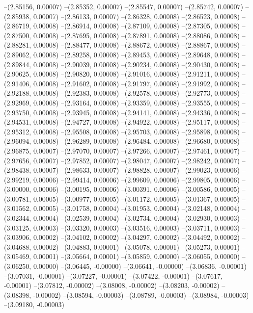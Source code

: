 --(2.85156, 0.00007)
--(2.85352, 0.00007)
--(2.85547, 0.00007)
--(2.85742, 0.00007)
--(2.85938, 0.00007)
--(2.86133, 0.00007)
--(2.86328, 0.00008)
--(2.86523, 0.00008)
--(2.86719, 0.00008)
--(2.86914, 0.00008)
--(2.87109, 0.00008)
--(2.87305, 0.00008)
--(2.87500, 0.00008)
--(2.87695, 0.00008)
--(2.87891, 0.00008)
--(2.88086, 0.00008)
--(2.88281, 0.00008)
--(2.88477, 0.00008)
--(2.88672, 0.00008)
--(2.88867, 0.00008)
--(2.89062, 0.00008)
--(2.89258, 0.00008)
--(2.89453, 0.00008)
--(2.89648, 0.00008)
--(2.89844, 0.00008)
--(2.90039, 0.00008)
--(2.90234, 0.00008)
--(2.90430, 0.00008)
--(2.90625, 0.00008)
--(2.90820, 0.00008)
--(2.91016, 0.00008)
--(2.91211, 0.00008)
--(2.91406, 0.00008)
--(2.91602, 0.00008)
--(2.91797, 0.00008)
--(2.91992, 0.00008)
--(2.92188, 0.00008)
--(2.92383, 0.00008)
--(2.92578, 0.00008)
--(2.92773, 0.00008)
--(2.92969, 0.00008)
--(2.93164, 0.00008)
--(2.93359, 0.00008)
--(2.93555, 0.00008)
--(2.93750, 0.00008)
--(2.93945, 0.00008)
--(2.94141, 0.00008)
--(2.94336, 0.00008)
--(2.94531, 0.00008)
--(2.94727, 0.00008)
--(2.94922, 0.00008)
--(2.95117, 0.00008)
--(2.95312, 0.00008)
--(2.95508, 0.00008)
--(2.95703, 0.00008)
--(2.95898, 0.00008)
--(2.96094, 0.00008)
--(2.96289, 0.00008)
--(2.96484, 0.00008)
--(2.96680, 0.00008)
--(2.96875, 0.00007)
--(2.97070, 0.00007)
--(2.97266, 0.00007)
--(2.97461, 0.00007)
--(2.97656, 0.00007)
--(2.97852, 0.00007)
--(2.98047, 0.00007)
--(2.98242, 0.00007)
--(2.98438, 0.00007)
--(2.98633, 0.00007)
--(2.98828, 0.00007)
--(2.99023, 0.00006)
--(2.99219, 0.00006)
--(2.99414, 0.00006)
--(2.99609, 0.00006)
--(2.99805, 0.00006)
--(3.00000, 0.00006)
--(3.00195, 0.00006)
--(3.00391, 0.00006)
--(3.00586, 0.00005)
--(3.00781, 0.00005)
--(3.00977, 0.00005)
--(3.01172, 0.00005)
--(3.01367, 0.00005)
--(3.01562, 0.00005)
--(3.01758, 0.00004)
--(3.01953, 0.00004)
--(3.02148, 0.00004)
--(3.02344, 0.00004)
--(3.02539, 0.00004)
--(3.02734, 0.00004)
--(3.02930, 0.00003)
--(3.03125, 0.00003)
--(3.03320, 0.00003)
--(3.03516, 0.00003)
--(3.03711, 0.00003)
--(3.03906, 0.00002)
--(3.04102, 0.00002)
--(3.04297, 0.00002)
--(3.04492, 0.00002)
--(3.04688, 0.00002)
--(3.04883, 0.00001)
--(3.05078, 0.00001)
--(3.05273, 0.00001)
--(3.05469, 0.00001)
--(3.05664, 0.00001)
--(3.05859, 0.00000)
--(3.06055, 0.00000)
--(3.06250, 0.00000)
--(3.06445, -0.00000)
--(3.06641, -0.00000)
--(3.06836, -0.00001)
--(3.07031, -0.00001)
--(3.07227, -0.00001)
--(3.07422, -0.00001)
--(3.07617, -0.00001)
--(3.07812, -0.00002)
--(3.08008, -0.00002)
--(3.08203, -0.00002)
--(3.08398, -0.00002)
--(3.08594, -0.00003)
--(3.08789, -0.00003)
--(3.08984, -0.00003)
--(3.09180, -0.00003)
